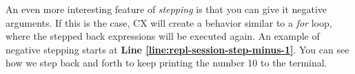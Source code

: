 \documentclass[11pt,fleqn,openany]{book} %
\begin{document}
An even more interesting feature of \emph{stepping} is that you can give it negative arguments. If this is the case, CX will create a behavior similar to a \emph{for} loop, where the stepped back expressions will be executed again. An example of negative stepping starts at \textbf{Line \ref{line:repl-session-step-minus-1}}. You can see how we step back and forth to keep printing the number 10 to the terminal.


\end{document}
